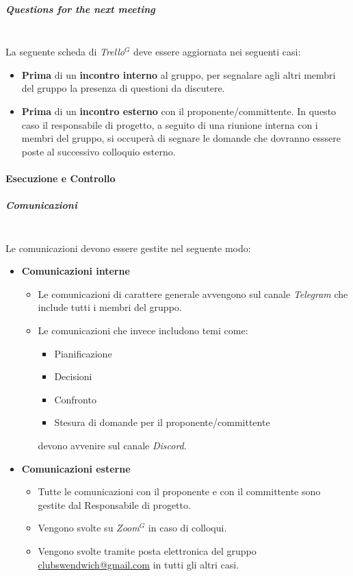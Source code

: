 \subparagraph{Questions for the next meeting}
\mbox{}\\
La seguente scheda di \textit{Trello}$^G$ deve essere aggiornata nei seguenti casi:
\begin{itemize}
    \item \textbf{Prima} di un \textbf{incontro interno} al gruppo, per segnalare agli altri membri del gruppo
    la presenza di questioni da discutere.
    \item \textbf{Prima} di un \textbf{incontro esterno} con il proponente/committente. In questo caso il responsabile
    di progetto, a seguito di una riunione interna con i membri del gruppo, si occuperà di segnare le
    domande che dovranno esssere poste al successivo colloquio esterno.
\end{itemize}

\paragraph{Esecuzione e Controllo}

\subparagraph{Comunicazioni}
\mbox{}\\

Le comunicazioni devono essere gestite nel seguente modo:
\begin{itemize}
    \item \textbf{Comunicazioni interne}
    \begin{itemize}
        \item Le comunicazioni di carattere generale avvengono sul canale \textit{Telegram}
        che include tutti i membri del gruppo.
        \item Le comunicazioni che invece includono temi come:
        \begin{itemize}
            \item Pianificazione
            \item Decisioni
            \item Confronto
            \item Stesura di domande per il proponente/committente
        \end{itemize}
        devono avvenire sul canale \textit{Discord}.
    \end{itemize}
    \item \textbf{Comunicazioni esterne}
    \begin{itemize}
        \item Tutte le comunicazioni con il proponente e con il committente sono gestite dal Responsabile di progetto.
        \item Vengono svolte su \textit{Zoom}$^{G}$ in caso di colloqui.
        \item Vengono svolte tramite posta elettronica del gruppo \href{mailto:clubswendwich@gmail.com}{clubswendwich@gmail.com} in tutti gli altri casi.
    \end{itemize}
\end{itemize}

